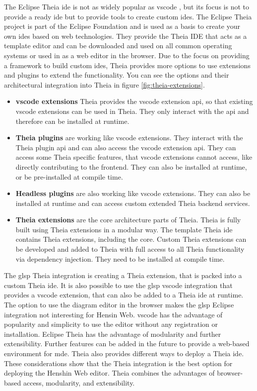 \documentclass[conference,onecolumn]{IEEEtran}
\begin{document}
  The Eclipse Theia \acs{ide} is not as widely popular as \ac{vscode} \cite{stackoverflow2024survey}, but its focus is not to provide a ready \acs{ide} but to provide tools to create custom \acsp{ide}. The Eclipse Theia project is part of the Eclipse Foundation and is used as a basis to create your own \acsp{ide} based on web technologies. \cite{theia-doc} They provide the Theia IDE that acts as a template editor and can be downloaded and used on all common operating systems or used in as a web editor in the browser. Due to the focus on providing a framework to build custom \acsp{ide}, Theia provides more options to use extensions and plugins to extend the functionality. You can see the options and their architectural integration into Theia in figure \ref{fig:theia-extensions}.
  \begin{itemize}
    \item \textbf{\ac{vscode} extensions} Theia provides the \ac{vscode} extension \acs{api}, so that existing \ac{vscode} extensions can be used in Theia. They only interact with the \acs{api} and therefore can be installed at runtime.
    \item \textbf{Theia plugins} are working like \ac{vscode} extensions. They interact with the Theia plugin \acs{api} and can also access the \ac{vscode} extension \acs{api}. They can access some Theia specific features, that \ac{vscode} extensions cannot access, like directly contributing to the frontend. They can also be installed at runtime, or be pre-installed at compile time.
    \item \textbf{Headless plugins} are also working like \ac{vscode} extensions. They can also be installed at runtime and can access custom extended Theia backend services.
    \item \textbf{Theia extensions} are the core architecture parts of Theia. Theia is fully built using Theia extensions in a modular way. The template Theia \acs{ide} contains Theia extensions, including the core. Custom Theia extensions can be developed and added to Theia with full access to all Theia functionality via dependency injection. They need to be installed at compile time. \cite{theia-doc}
  \end{itemize}

  The \ac{glsp} Theia integration is creating a Theia extension, that is packed into a custom Theia \acs{ide}. It is also possible to use the \ac{glsp} \ac{vscode} integration that provides a \ac{vscode} extension, that can also be added to a Theia \acs{ide} at runtime. \cite{glsp-repo} The option to use the diagram editor in the browser makes the \ac{glsp} Eclipse integration not interesting for Hensin Web. \ac{vscode} has the advantage of popularity and simplicity to use the editor without any registration or installation. Eclipse Theia has the advantage of modularity and further extensibility. Further features can be added in the future to provide a web-based environment for \ac{mde}. Theia also provides different ways to deploy a Theia \acs{ide}.   These considerations show that the Theia integration is the best option for deploying the Henshin Web editor. Theia combines the advantages of browser-based access, modularity, and extensibility.
\end{document}

